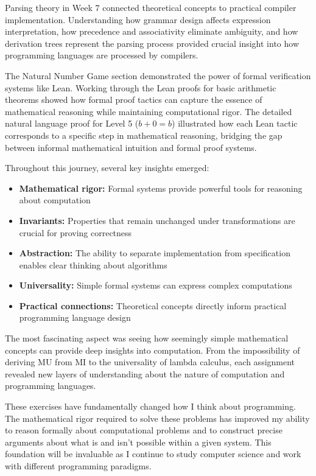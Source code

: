 \documentclass{article}
\theoremstyle{plain}
\theoremstyle{definition}
\theoremstyle{remark}
\begin{document}
Parsing theory in Week 7 connected theoretical concepts to practical compiler implementation. Understanding how grammar design affects expression interpretation, how precedence and associativity eliminate ambiguity, and how derivation trees represent the parsing process provided crucial insight into how programming languages are processed by compilers.

The Natural Number Game section demonstrated the power of formal verification systems like Lean. Working through the Lean proofs for basic arithmetic theorems showed how formal proof tactics can capture the essence of mathematical reasoning while maintaining computational rigor. The detailed natural language proof for Level 5 ($b + 0 = b$) illustrated how each Lean tactic corresponds to a specific step in mathematical reasoning, bridging the gap between informal mathematical intuition and formal proof systems.

Throughout this journey, several key insights emerged:

\begin{itemize}
\item \textbf{Mathematical rigor:} Formal systems provide powerful tools for reasoning about computation
\item \textbf{Invariants:} Properties that remain unchanged under transformations are crucial for proving correctness
\item \textbf{Abstraction:} The ability to separate implementation from specification enables clear thinking about algorithms
\item \textbf{Universality:} Simple formal systems can express complex computations
\item \textbf{Practical connections:} Theoretical concepts directly inform practical programming language design
\end{itemize}

The most fascinating aspect was seeing how seemingly simple mathematical concepts can provide deep insights into computation. From the impossibility of deriving MU from MI to the universality of lambda calculus, each assignment revealed new layers of understanding about the nature of computation and programming languages.

These exercises have fundamentally changed how I think about programming. The mathematical rigor required to solve these problems has improved my ability to reason formally about computational problems and to construct precise arguments about what is and isn't possible within a given system. This foundation will be invaluable as I continue to study computer science and work with different programming paradigms.
\end{document}
